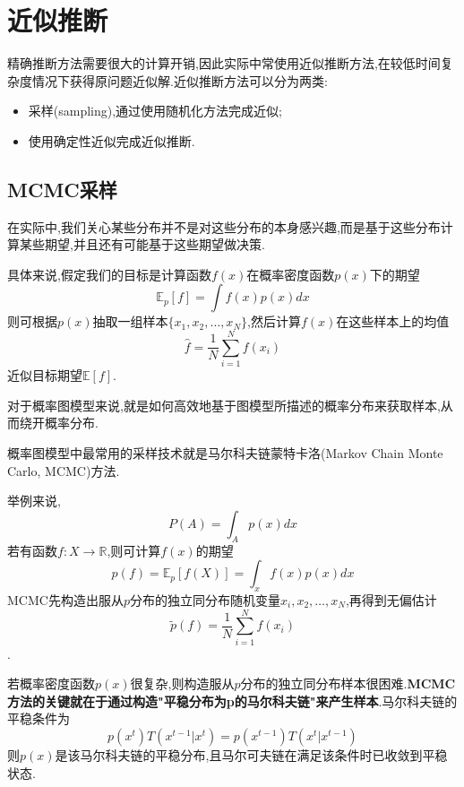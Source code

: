 \section{近似推断}

精确推断方法需要很大的计算开销,因此实际中常使用近似推断方法,在较低时间复杂度情况下获得原问题近似解.近似推断方法可以分为两类:
\begin{itemize}
\item 采样(sampling),通过使用随机化方法完成近似;
\item 使用确定性近似完成近似推断.
\end{itemize}

\subsection{MCMC采样}

在实际中,我们关心某些分布并不是对这些分布的本身感兴趣,而是基于这些分布计算某些期望,并且还有可能基于这些期望做决策.

具体来说,假定我们的目标是计算函数$f(x)$在概率密度函数$p(x)$下的期望
\begin{equation}
\mathbb E_p[f]=\int f(x)p(x)dx
\end{equation}
则可根据$p(x)$抽取一组样本$\{x_1,x_2,\dots,x_N\}$,然后计算$f(x)$在这些样本上的均值
\begin{equation}
\hat f=\frac{1}{N}\sum_{i=1}^Nf(x_i)
\end{equation}
近似目标期望$\mathbb E[f]$.

对于概率图模型来说,就是如何高效地基于图模型所描述的概率分布来获取样本,从而绕开概率分布.

概率图模型中最常用的采样技术就是马尔科夫链蒙特卡洛(Markov Chain Monte Carlo, MCMC)方法.

举例来说,
\begin{equation}
P(A)=\int_Ap(x)dx
\end{equation}
若有函数$f:X\rightarrow\mathbb R$,则可计算$f(x)$的期望
\begin{equation}
p(f)=\mathbb E_p[f(X)]=\int_xf(x)p(x)dx
\end{equation}
MCMC先构造出服从$p$分布的独立同分布随机变量$x_i,x_2,\dots,x_N$,再得到无偏估计
\begin{equation}
\tilde p(f)=\frac{1}{N}\sum_{i=1}^Nf(x_i)
\end{equation}
.

若概率密度函数$p(x)$很复杂,则构造服从$p$分布的独立同分布样本很困难.\textbf{MCMC方法的关键就在于通过构造"平稳分布为p的马尔科夫链"来产生样本}.马尔科夫链的平稳条件为
\begin{equation}
p(x^t)T(x^{t-1}|x^t)=p(x^{t-1})T(x^t|x^{t-1})
\end{equation}
则$p(x)$是该马尔科夫链的平稳分布,且马尔可夫链在满足该条件时已收敛到平稳状态.


